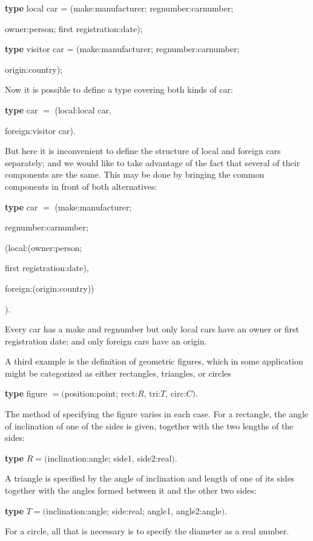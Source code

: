 \quad \textbf{type} local car = (make:manufacturer; regnumber:carnumber;

\tabto{9.4em} owner:person; first registration:date);

\quad \textbf{type} visitor car = (make:manufacturer; regnumber:carnumber;

\tabto{10.1em} origin:country);

Now it is possible to define a type covering both kinds of car:

\quad \textbf{type} car $=$ (local:local car,

\tabto{7.4em} foreign:visitor car).

\noindent
But here it is inconvenient to define the structure of local and foreign cars separately; and we would like to take advantage of the fact that several of their components are the same. This may be done by bringing the common components in front of both alternatives:

\quad \textbf{type} car $=$ (make:manufacturer;

\tabto{7.5em}regnumber:carnumber;

\tabto{7.5em}(local:(owner:person;

\tabto{7.8em}first registration:date),

\tabto{7.8em}foreign:(origin:country))

\tabto{7.1em}).

\noindent
Every car has a make and regnumber but only local cars have an owner or first registration date; and only foreign cars have an origin. 

A third example is the definition of geometric figures, which in some application might be categorized as either rectangles, triangles, or circles

\quad \textbf{type} figure $= ($position:point; rect:$R$, tri:$T$, circ:$C)$.

\noindent
The method of specifying the figure varies in each case. For a rectangle, the angle of inclination of one of the sides is given, together with the two lengths of the sides:

\quad \textbf{type} $R = ($inclination:angle; side1, side2:real$)$.

\noindent
A triangle is specified by the angle of inclination and length of one of its sides together with the angles formed between it and the other two sides:

\quad \textbf{type} $T = ($inclination:angle; side:real; angle1, angle2:angle$)$.

\noindent
For a circle, all that is necessary is to specify the diameter as a real number.

